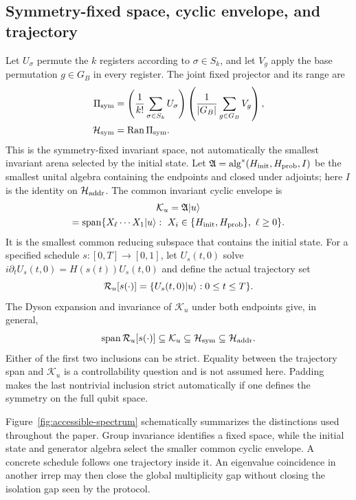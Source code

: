 \subsection{Symmetry-fixed space, cyclic envelope, and trajectory}

Let $U_\sigma$ permute the $k$ registers according to $\sigma\in S_k$, and
let $V_g$ apply the base permutation $g\in G_B$ in every register.  The
joint fixed projector and its range are
\begin{align}
 \Pi_{\rm sym}
 &=\left(\frac1{k!}\sum_{\sigma\in S_k}U_\sigma\right)
 \left(\frac1{|G_B|}\sum_{g\in G_B}V_g\right),\\
 \mathcal H_{\rm sym}&=\operatorname{Ran}\Pi_{\rm sym}.
 \label{eq:hsym-rewrite}
\end{align}
This is the symmetry-fixed invariant space, not automatically the smallest
invariant arena selected by the initial state.  Let
$\mathfrak A=\operatorname{alg}^*(H_{\rm init},H_{\rm prob},I)$ be the
smallest unital algebra containing the endpoints and closed under adjoints;
here $I$ is the identity on $\mathcal H_{\rm addr}$.  The common invariant
cyclic envelope is
\begin{multline}
 \mathcal K_u=\mathfrak A\lvert u\rangle\\
 =\operatorname{span}\{X_\ell\cdots X_1\lvert u\rangle:\
 X_i\in\{H_{\rm init},H_{\rm prob}\},\ \ell\geq0\}.
 \label{eq:ku-rewrite}
\end{multline}
It is the smallest common reducing subspace that contains the initial state.
For a specified schedule $s:[0,T]\to[0,1]$, let $U_s(t,0)$ solve
$i\partial_tU_s(t,0)=H(s(t))U_s(t,0)$ and define the actual trajectory set
\begin{equation}
 \mathcal R_u[s(\cdot)]
 =\{U_s(t,0)\lvert u\rangle:0\leq t\leq T\}.
 \label{eq:trajectory-set}
\end{equation}
The Dyson expansion and invariance of $\mathcal K_u$ under both endpoints
give, in general,
\begin{equation}
 \operatorname{span}\mathcal R_u[s(\cdot)]
 \subseteq\mathcal K_u\subseteq\mathcal H_{\rm sym}
 \subseteq\mathcal H_{\rm addr}.
 \label{eq:nested-spaces-rewrite}
\end{equation}
Either of the first two inclusions can be strict.  Equality between the
trajectory span and $\mathcal K_u$ is a controllability question and is not
assumed here.  Padding makes the last nontrivial inclusion strict
automatically if one defines the symmetry on the full qubit space.

Figure~\ref{fig:accessible-spectrum} schematically summarizes the
distinctions used throughout the paper.  Group invariance identifies a fixed
space, while the initial state and generator algebra select the smaller
common cyclic envelope.  A concrete schedule follows one trajectory inside
it.
An eigenvalue coincidence in another irrep may then close the global
multiplicity gap without closing the isolation gap seen by the protocol.

